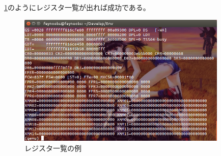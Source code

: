 \documentclass[a4j]{jarticle}
\begin{document}
\ref{fig:QEMU_REG_INFO}のようにレジスタ一覧が出れば成功である。
\begin{figure}[htbp]
	\begin{center}
    	\includegraphics[width=10cm]{./IMG/QEMU_INFO_REGISTERS.png}
	\end{center}
    \caption{レジスタ一覧の例}
    \label{fig:QEMU_REG_INFO}
\end{figure}
\end{document}

